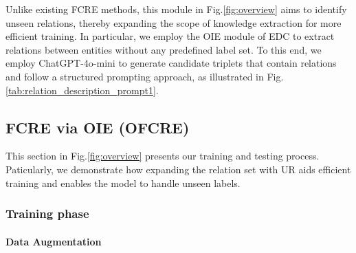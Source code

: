 
Unlike existing FCRE methods, this module in Fig.\ref{fig:overview} aims to identify unseen relations, thereby expanding the scope of knowledge extraction for more efficient training. In particular, we employ the OIE module of EDC to extract relations between entities without any predefined label set. To this end, we employ ChatGPT-4o-mini to generate candidate triplets that contain relations and follow a structured prompting approach, as illustrated in Fig.\ref{tab:relation_description_prompt1}.




\subsection{FCRE via OIE (OFCRE)} 
\label{sec:fcre}
This section in Fig.\ref{fig:overview} presents our training and testing process. Paticularly, we demonstrate how expanding the relation set with UR aids efficient training and enables the model to handle unseen labels.

\subsubsection{Training phase}

\paragraph{Data Augmentation}
\label{sec:augment}

